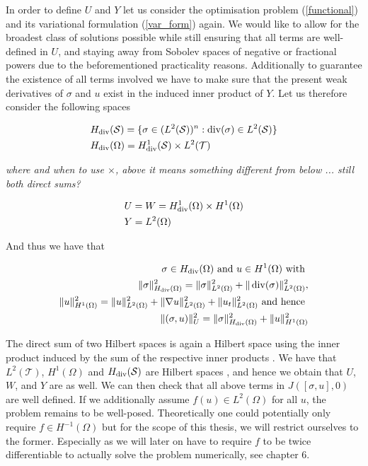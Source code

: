 \documentclass[../draft_1.tex]{subfiles}
\begin{document}
In order to define $U$ and $Y$ let us consider the optimisation problem (\ref{functional}) and its variational formulation (\ref{var_form}) again. We would like to allow for the broadest class of solutions possible while still ensuring that all terms are well-defined in $U$, and staying away from Sobolev spaces of negative or fractional powers due to the beforementioned practicality reasons. Additionally to guarantee the existence of all terms involved we have to make sure that the present weak derivatives of $\sigma$ and $u$ exist in the induced inner product of $Y$. Let us therefore consider the following spaces 
\begin{ceqn}
	\begin{align}
	&H_{\mathop{}\!\mathrm{div}}(\mathcal{S}) = \{\sigma \in (L^2(\mathcal{S}))^n : \mathop{}\!\mathrm{div} (\sigma) \in L^2(\mathcal{S})\} \\
    &H_{\mathop{}\!\mathrm{div}}(\Omega) = H_{\mathop{}\!\mathrm{div}}^1(\mathcal{S}) \times L^2(\mathcal{T}) 
    	\end{align}
\end{ceqn}
\textit{where and when to use $\times$, above it means something different from below ... still both direct sums?}
\begin{ceqn}
	\begin{align}
    & U = W = H_{\mathop{}\!\mathrm{div}}^1(\Omega) \times H^1(\Omega) \\
    & Y = L^2(\Omega)
	\end{align}
\end{ceqn}
 And thus we have that
\begin{ceqn}

	\begin{align}
	\label{spacesLS}
	\sigma \in H_{\mathop{}\!\mathrm{div}}(\Omega) \text{  and  } u \in H^1(\Omega) \text { with } \\
	\| \sigma \|_{H_{\mathop{}\!\mathrm{div}}(\Omega)}^2 = \| \sigma \|_{L^2(\Omega)}^2 + \| \mathop{}\!\mathrm{div}(\sigma) \|_{L^2(\Omega)}^2, \\
	 \|u \|_{H^1(\Omega)}^2 = \| u \|_{L^2(\Omega)}^2 + \| \nabla u \|_{L^2(\Omega)}^2 + \| u_t \|_{L^2(\Omega)}^2 \text{ and hence } \\
	 \| (\sigma, u) \|_U^2 = \| \sigma \|_{H_{\mathop{}\!\mathrm{div}}(\Omega)}^2 + \| u \|_{H^1(\Omega)}^2 \\
	\end{align}

\end{ceqn}
The direct sum of two Hilbert spaces is again a Hilbert space using the inner product induced by the sum of the respective inner products \cite{conway2013course}. We have that $L^2(\mathcal{T})$, $H^1(\Omega)$ and $H_{\mathop{}\!\mathrm{div}}(\mathcal{S})$ are Hilbert spaces \cite{tartar2007introduction}, and hence we obtain that $U$, $W$, and $Y$ are as well. We can then check that all above terms in $J([\sigma, u], 0)$ are well defined. If we additionally assume $f(u) \in L^2(\Omega)$ for all $u$, the problem remains to be well-posed. Theoretically one could potentially only require $f \in H^{-1}(\Omega)$ but for the scope of this thesis, we will restrict ourselves to the former. Especially as we will later on have to require $f$ to be twice differentiable to actually solve the problem numerically, see chapter 6.
\end{document}
